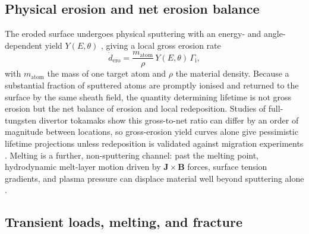 \subsection{Physical erosion and net erosion balance}

The eroded surface undergoes physical sputtering with an energy- and angle-dependent yield $Y(E,\theta)$ \cite{ref0143,ref0144}, giving a local gross erosion rate
\begin{equation}
\dot{d}_{\mathrm{ero}} = \frac{m_{\mathrm{atom}}}{\rho}\, Y(E,\theta)\, \Gamma_{\mathrm{i}},
\label{ch18-eq:erosion-rate}
\end{equation}
with $m_{\mathrm{atom}}$ the mass of one target atom and $\rho$ the material density. Because a substantial fraction of sputtered atoms are promptly ionised and returned to the surface by the same sheath field, the quantity determining lifetime is not gross erosion but the net balance of erosion and local redeposition. Studies of full-tungsten divertor tokamaks show this gross-to-net ratio can differ by an order of magnitude between locations, so gross-erosion yield curves alone give pessimistic lifetime projections unless redeposition is validated against migration experiments \cite{ref0593}. Melting is a further, non-sputtering channel: past the melting point, hydrodynamic melt-layer motion driven by $\mathbf{J}\times\mathbf{B}$ forces, surface tension gradients, and plasma pressure can displace material well beyond sputtering alone \cite{ref0176}.

\subsection{Transient loads, melting, and fracture}

